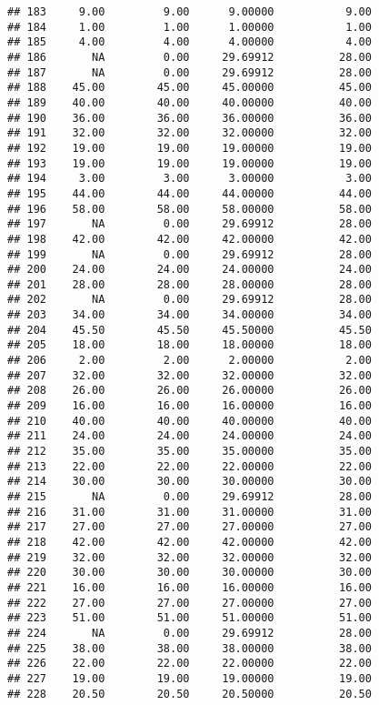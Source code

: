 \documentclass[
]{article}
\begin{document}
\begin{verbatim}
## 183     9.00         9.00      9.00000           9.00
## 184     1.00         1.00      1.00000           1.00
## 185     4.00         4.00      4.00000           4.00
## 186       NA         0.00     29.69912          28.00
## 187       NA         0.00     29.69912          28.00
## 188    45.00        45.00     45.00000          45.00
## 189    40.00        40.00     40.00000          40.00
## 190    36.00        36.00     36.00000          36.00
## 191    32.00        32.00     32.00000          32.00
## 192    19.00        19.00     19.00000          19.00
## 193    19.00        19.00     19.00000          19.00
## 194     3.00         3.00      3.00000           3.00
## 195    44.00        44.00     44.00000          44.00
## 196    58.00        58.00     58.00000          58.00
## 197       NA         0.00     29.69912          28.00
## 198    42.00        42.00     42.00000          42.00
## 199       NA         0.00     29.69912          28.00
## 200    24.00        24.00     24.00000          24.00
## 201    28.00        28.00     28.00000          28.00
## 202       NA         0.00     29.69912          28.00
## 203    34.00        34.00     34.00000          34.00
## 204    45.50        45.50     45.50000          45.50
## 205    18.00        18.00     18.00000          18.00
## 206     2.00         2.00      2.00000           2.00
## 207    32.00        32.00     32.00000          32.00
## 208    26.00        26.00     26.00000          26.00
## 209    16.00        16.00     16.00000          16.00
## 210    40.00        40.00     40.00000          40.00
## 211    24.00        24.00     24.00000          24.00
## 212    35.00        35.00     35.00000          35.00
## 213    22.00        22.00     22.00000          22.00
## 214    30.00        30.00     30.00000          30.00
## 215       NA         0.00     29.69912          28.00
## 216    31.00        31.00     31.00000          31.00
## 217    27.00        27.00     27.00000          27.00
## 218    42.00        42.00     42.00000          42.00
## 219    32.00        32.00     32.00000          32.00
## 220    30.00        30.00     30.00000          30.00
## 221    16.00        16.00     16.00000          16.00
## 222    27.00        27.00     27.00000          27.00
## 223    51.00        51.00     51.00000          51.00
## 224       NA         0.00     29.69912          28.00
## 225    38.00        38.00     38.00000          38.00
## 226    22.00        22.00     22.00000          22.00
## 227    19.00        19.00     19.00000          19.00
## 228    20.50        20.50     20.50000          20.50

\end{verbatim}
\end{document}
